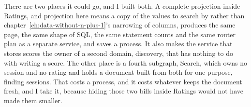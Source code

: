 %
%
There are two places it could go, and I built both. A complete projection
inside Ratings, and projection here means a copy of the values to search by
rather than chapter~\ref{ch:data-without-n-plus-1}'s narrowing of columns,
produces the same page, the same shape of SQL, the same statement counts and
the same router plan as a separate service, and saves a process. It also
makes the service that stores scores the owner of a second domain, discovery,
that has nothing to do with writing a score. The other place is a fourth
subgraph, Search, which owns no session and no rating and holds a document
built from both for one purpose, finding sessions. That costs a process, and
it costs whatever keeps the document fresh, and I take it, because hiding
those two bills inside Ratings would not have made them smaller.
%
